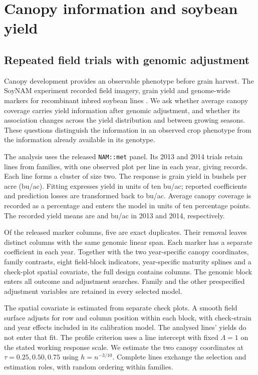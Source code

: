 \section{Canopy information and soybean yield}\label{sec:application}

\subsection{Repeated field trials with genomic adjustment}

Canopy development provides an observable phenotype before grain harvest.
The SoyNAM experiment recorded field imagery, grain yield and genome-wide
markers for recombinant inbred soybean lines \cite{xavier2017canopy}.
We ask whether average canopy coverage carries yield information after
genomic adjustment, and whether its association changes across the yield
distribution and between growing seasons. These questions distinguish
the information in an observed crop phenotype from the information
already available in its genotype.

The analysis uses the released \texttt{NAM::met} panel. Its 2013 and 2014
trials retain \SoyLines{} lines from \SoyFamilies{} families, with one
observed plot per line in each year, giving \SoyRecords{} records.
Each line forms a cluster of size two. The response is grain yield in
bushels per acre (bu/ac). Fitting expresses yield in units of ten bu/ac;
reported coefficients and prediction losses are transformed back to bu/ac.
Average canopy coverage is recorded as a
percentage and enters the model in units of ten percentage points.
The recorded yield means are \SoyYieldMeanThirteen{} and
\SoyYieldMeanFourteen{} bu/ac in 2013 and 2014, respectively.

Of the released \SoyOriginalMarkers{} marker columns, five are exact
duplicates. Their removal leaves \SoyMarkers{} distinct columns with
the same genomic linear span. Each marker has a separate coefficient
in each year. Together with the two year-specific canopy coordinates,
family contrasts, eight field-block indicators, year-specific maturity
splines and a check-plot spatial covariate, the full design contains
\SoyDimension{} columns. The genomic block enters all outcome and
adjustment searches. Family and the other prespecified adjustment
variables are retained in every selected model.

The spatial covariate is estimated from \SoyCheckPlots{} separate
check plots. A smooth field surface adjusts for row and column position
within each block, with check-strain and year effects included in its
calibration model. The analysed lines' yields do not enter that fit.
The profile criterion uses a line intercept with fixed $\Lambda=1$
on the stated working response scale.
We estimate the two canopy coordinates at $\tau=0.25,0.50,0.75$ using
$h=n^{-3/10}$. Complete lines exchange the selection and estimation
roles, with random ordering within families.

